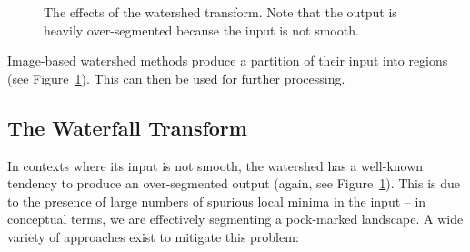 \documentclass[preprint,a4paper]{elsarticle}
\newenvironment{stusubfig}[1]
{
	\begin{figure}[#1]
	\begin{center}
}
{
	\end{center}
	\end{figure}
}
\begin{document}
\begin{stusubfig}{p}
	\hspace{4mm}%
\caption{The effects of the watershed transform. Note that the output is heavily over-segmented because the input is not smooth.}
\label{fig:segmentation-watershed-adfexample}
\end{stusubfig}

\noindent Image-based watershed methods produce a partition of their input into regions (see Figure~\ref{fig:segmentation-watershed-adfexample}). This can then be used for further processing.

\subsection{The Waterfall Transform}

In contexts where its input is not smooth, the watershed has a well-known tendency to produce an over-segmented output (again, see Figure~\ref{fig:segmentation-watershed-adfexample}). This is due to the presence of large numbers of spurious local minima in the input -- in conceptual terms, we are effectively segmenting a pock-marked landscape. A wide variety of approaches exist to mitigate this problem:
\end{document}
